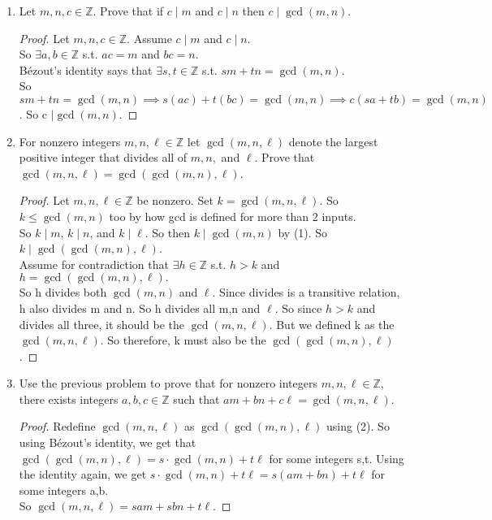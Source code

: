 \documentclass[12pt]{article}
\newcommand{\Z}{\mathbb{Z}}
\begin{document}
\begin{enumerate}
\item Let $m,n,c \in \mathbb Z$. Prove that if $c \mid m$ and $c \mid n$ then $c \mid \gcd(m,n)$. 
\begin{proof}
	Let $m,n,c \in \mathbb Z$. Assume $c \mid m$ and $c \mid n$.\\
	So $\exists a,b\in\Z$ s.t. $ac = m$ and $bc=n$. \\
	B\'ezout's identity says that $\exists s,t\in\Z$ s.t. $sm+tn = \gcd(m,n)$.\\
	So $sm+tn = \gcd(m,n) \implies s(ac)+t(bc) = \gcd(m,n) \implies c(sa+tb) = \gcd(m,n)$. So c $\mid \gcd(m,n)$.
\end{proof}

\medskip

\item For nonzero integers $m,n, \ell \in \mathbb Z$ let $\gcd(m,n,\ell)$ denote the largest positive integer that divides all of $m, n,$ and $\ell$. Prove that $\gcd(m,n,\ell) = \gcd(\gcd(m,n), \ell)$. 
\begin{proof}
	Let $m,n, \ell \in \mathbb Z$ be nonzero. Set $k = \gcd(m,n,\ell)$. So $k \leq \gcd(m,n)$ too by how gcd is defined for more than 2 inputs.\\
	So $k \mid m$, $k \mid n$, and $k \mid \ell$. So then $k \mid \gcd(m,n)$ by (1).
	So $k \mid \gcd(\gcd(m,n),\ell)$.\\
	Assume for contradiction that $\exists h\in\Z$ s.t. $h>k$ and $h=\gcd(\gcd(m,n),\ell).$\\
	So h divides both $\gcd(m,n)$ and $\ell$. Since divides is a transitive relation, h also divides m and n. So h divides all m,n and $\ell$. So since $h>k$ and divides all three, it should be the $\gcd(m,n,\ell)$. But we defined k as the $\gcd(m,n,\ell)$. So therefore, k must also be the $\gcd(\gcd(m,n),\ell)$.
\end{proof}


\medskip

\item Use the previous problem to prove that for nonzero integers $m, n, \ell \in \mathbb Z$, there exists integers $a,b,c \in \mathbb Z$ such that $am + bn + c\ell = \gcd(m,n,\ell)$.
\begin{proof}
	Redefine $\gcd(m,n,\ell)$ as $\gcd(\gcd(m,n),\ell)$ using (2). So using B\'ezout's identity, we get that $\gcd(\gcd(m,n),\ell) = s\cdot\gcd(m,n)+t\ell$ for some integers s,t. Using the identity again, we get $s\cdot\gcd(m,n)+t\ell = s(am+bn) + t\ell$ for some integers a,b.\\
	So $\gcd(m,n,\ell) = sam + sbn + t\ell$.
\end{proof}


\end{enumerate}
\end{document}
